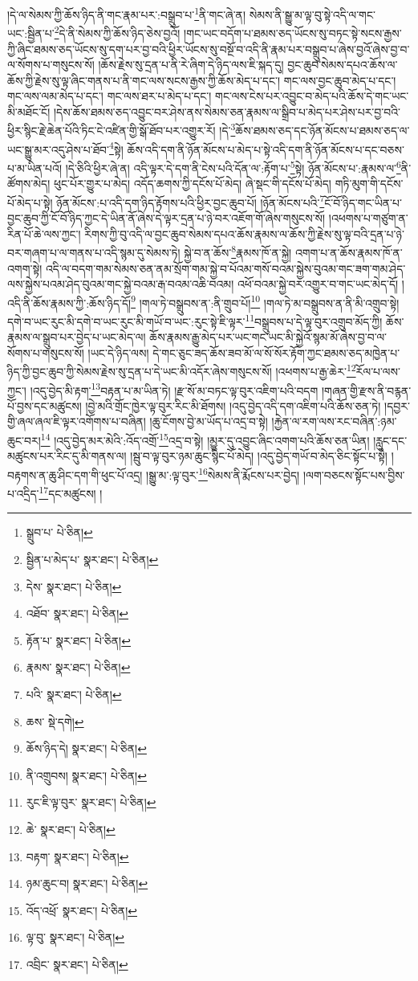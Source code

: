 །དེ་ལ་སེམས་ཀྱི་ཆོས་ཉིད་ནི་གང་རྣམ་པར་:བསྒྲུབ་པ་\footnote{སྒྲུབ་པ་  པེ་ཅིན། }ནི་གང་ཞེ་ན། སེམས་ནི་སྒྱུ་མ་ལྟ་བུ་སྟེ་འདི་ལ་གང་ཡང་:སྦྱིན་པ་\footnote{སྦྱིན་པ་མེད་པ་  སྣར་ཐང་།  པེ་ཅིན། }དེ་ནི་སེམས་ཀྱི་ཆོས་ཉིད་ཅེས་བྱའོ། །གང་ཡང་བདོག་པ་ཐམས་ཅད་ཡོངས་སུ་བཏང་སྟེ་སངས་རྒྱས་ཀྱི་ཞིང་ཐམས་ཅད་ཡོངས་སུ་དག་པར་བྱ་བའི་ཕྱིར་ཡོངས་སུ་བསྔོ་བ་འདི་ནི་རྣམ་པར་བསྒྲུབ་པ་ཞེས་བྱའོ་ཞེས་བྱ་བ་ལ་སོགས་པ་གསུངས་སོ། །ཆོས་རྗེས་སུ་དྲན་པ་ནི་རེ་ཞིག་དེ་ཉིད་ལས་ཇི་སྐད་དུ། བྱང་ཆུབ་སེམས་དཔའ་ཆོས་ལ་ཆོས་ཀྱི་རྗེས་སུ་ལྟ་ཞིང་གནས་པ་ནི་གང་ལས་སངས་རྒྱས་ཀྱི་ཆོས་མེད་པ་དང་། གང་ལས་བྱང་ཆུབ་མེད་པ་དང་། གང་ལས་ལམ་མེད་པ་དང་། གང་ལས་ཐར་པ་མེད་པ་དང་། གང་ལས་ངེས་པར་འབྱུང་བ་མེད་པའི་ཆོས་དེ་གང་ཡང་མི་མཐོང་ངོ། །དེས་ཆོས་ཐམས་ཅད་འབྱུང་བར་ཤེས་ནས་སེམས་ཅན་རྣམས་ལ་སྒྲིབ་པ་མེད་པར་ཤེས་པར་བྱ་བའི་ཕྱིར་སྙིང་རྗེ་ཆེན་པོའི་ཏིང་ངེ་འཛིན་གྱི་སྒོ་ཐོབ་པར་འགྱུར་རོ། །དེ་\footnote{དེས་  སྣར་ཐང་།  པེ་ཅིན། }ཆོས་ཐམས་ཅད་དང་ཉོན་མོངས་པ་ཐམས་ཅད་ལ་ཡང་སྒྱུ་མར་འདུ་ཤེས་པ་ཐོབ་\footnote{འཐོབ་  སྣར་ཐང་།  པེ་ཅིན། }སྟེ། ཆོས་འདི་དག་ནི་ཉོན་མོངས་པ་མེད་པ་སྟེ་འདི་དག་ནི་ཉོན་མོངས་པ་དང་བཅས་པ་མ་ཡིན་པའོ། །དེ་ཅིའི་ཕྱིར་ཞེ་ན། འདི་ལྟར་དེ་དག་ནི་ངེས་པའི་དོན་ལ་:རྟོག་པ་\footnote{རྟོན་པ་  སྣར་ཐང་།  པེ་ཅིན། }སྟེ། ཉོན་མོངས་པ་:རྣམས་ལ་\footnote{རྣམས་  སྣར་ཐང་།  པེ་ཅིན། }ནི་ཚོགས་མེད། ཕུང་པོར་གྱུར་པ་མེད། འདོད་ཆགས་ཀྱི་དངོས་པོ་མེད། ཞེ་སྡང་གི་དངོས་པོ་མེད། གཏི་མུག་གི་དངོས་པོ་མེད་པ་སྟེ། ཉོན་མོངས་:པ་འདི་དག་ཉིད་རྟོགས་པའི་ཕྱིར་བྱང་ཆུབ་པོ། །ཉོན་མོངས་པའི་\footnote{པའི་  སྣར་ཐང་།  པེ་ཅིན། }ངོ་བོ་ཉིད་གང་ཡིན་པ་བྱང་ཆུབ་ཀྱི་ངོ་བོ་ཉིད་ཀྱང་དེ་ཡིན་ནོ་ཞེས་དེ་ལྟར་དྲན་པ་ཉེ་བར་འཇོག་གོ་ཞེས་གསུངས་སོ། །འཕགས་པ་གཙུག་ན་རིན་པོ་ཆེ་ལས་ཀྱང་། རིགས་ཀྱི་བུ་འདི་ལ་བྱང་ཆུབ་སེམས་དཔའ་ཆོས་རྣམས་ལ་ཆོས་ཀྱི་རྗེས་སུ་ལྟ་བའི་དྲན་པ་ཉེ་བར་གཞག་པ་ལ་གནས་པ་འདི་སྙམ་དུ་སེམས་ཏེ། སྐྱེ་བ་ན་ཆོས་\footnote{ཆས་  སྡེ་དགེ། }རྣམས་ཁོ་ན་སྐྱེ། འགག་པ་ན་ཆོས་རྣམས་ཁོ་ན་འགག་སྟེ། འདི་ལ་བདག་གམ་སེམས་ཅན་ནམ་སྲོག་གམ་སྐྱེ་བ་པོའམ་གསོ་བའམ་སྐྱེས་བུའམ་གང་ཟག་གམ་ཤེད་ལས་སྐྱེས་པའམ་ཤེད་བུའམ་གང་སྐྱེ་བའམ་རྒ་བའམ་འཆི་བའམ། འཕོ་བའམ་སྐྱེ་བར་འགྱུར་བ་གང་ཡང་མེད་དོ། །འདི་ནི་ཆོས་རྣམས་ཀྱི་:ཆོས་ཉིད་དོ།\footnote{ཆོས་ཉིད་དེ།  སྣར་ཐང་།  པེ་ཅིན། } །གལ་ཏེ་བསྒྲུབས་ན་:ནི་གྲུབ་པོ།\footnote{ནི་འགྲུབས།  སྣར་ཐང་།  པེ་ཅིན། } །གལ་ཏེ་མ་བསྒྲུབས་ན་ནི་མི་འགྲུབ་སྟེ། དགེ་བ་ཡང་རུང་མི་དགེ་བ་ཡང་རུང་མི་གཡོ་བ་ཡང་:རུང་སྟེ་ཇི་ལྟར་\footnote{རུང་ཇི་ལྟ་བུར་  སྣར་ཐང་།  པེ་ཅིན། }བསྒྲུབས་པ་དེ་ལྟ་བུར་འགྲུབ་མོད་ཀྱི། ཆོས་རྣམས་ལ་སྒྲུབ་པར་བྱེད་པ་ཡང་མེད་ལ། ཆོས་རྣམས་རྒྱུ་མེད་པར་ཡང་གང་ཡང་མི་སྐྱེའོ་སྙམ་མོ་ཞེས་བྱ་བ་ལ་སོགས་པ་གསུངས་སོ། །ཡང་དེ་ཉིད་ལས། དེ་གང་ཅུང་ཟད་ཆོས་ཟབ་མོ་ལ་སོ་སོར་རྟོག་ཀྱང་ཐམས་ཅད་མཁྱེན་པ་ཉིད་ཀྱི་བྱང་ཆུབ་ཀྱི་སེམས་རྗེས་སུ་དྲན་པ་དེ་ཡང་མི་འདོར་ཞེས་གསུངས་སོ། །འཕགས་པ་རྒྱ་ཆེར་\footnote{ཆེ་  སྣར་ཐང་།  པེ་ཅིན། }རོལ་པ་ལས་ཀྱང་། །འདུ་བྱེད་མི་རྟག་\footnote{བརྟག་  སྣར་ཐང་།  པེ་ཅིན། }བརྟན་པ་མ་ཡིན་ཏེ། །རྫ་སོ་མ་བཏང་ལྟ་བུར་འཇིག་པའི་བདག །གཞན་གྱི་རྫས་ནི་བརྙན་པོ་བྱས་དང་མཚུངས། །བྱེ་མའི་གྲོང་ཁྱེར་ལྟ་བུར་རིང་མི་ཐོགས། །འདུ་བྱེད་འདི་དག་འཇིག་པའི་ཆོས་ཅན་ཏེ། །དབྱར་གྱི་ཞལ་ཞལ་ཇི་ལྟར་འགོགས་པ་བཞིན། །ཆུ་ངོགས་བྱེ་མ་ཡོད་པ་འདྲ་བ་སྟེ། །རྐྱེན་ལ་རག་ལས་རང་བཞིན་:ཉམ་ཆུང་བར།\footnote{ཉམ་ཆུང་བ།  སྣར་ཐང་།  པེ་ཅིན། } །འདུ་བྱེད་མར་མེའི་:འོད་འགྲོ་\footnote{འོད་འཕྲོ་  སྣར་ཐང་།  པེ་ཅིན། }འདྲ་བ་སྟེ། །མྱུར་དུ་འབྱུང་ཞིང་འགག་པའི་ཆོས་ཅན་ཡིན། །རླུང་དང་མཚུངས་པར་རིང་དུ་མི་གནས་ལ། །སྦུ་བ་ལྟ་བུར་ཉམ་ཆུང་སྙིང་པོ་མེད། །འདུ་བྱེད་གཡོ་བ་མེད་ཅིང་སྟོང་པ་སྟེ། །བརྟགས་ན་ཆུ་ཤིང་དག་གི་ཕུང་པོ་འདྲ། །སྒྱུ་མ་:ལྟ་བུར་\footnote{ལྟ་བུ་  སྣར་ཐང་།  པེ་ཅིན། }སེམས་ནི་རྨོངས་པར་བྱེད། །ལག་བཅངས་སྟོང་པས་བྱིས་པ་འདྲིད་\footnote{འབྲིང་  སྣར་ཐང་།  པེ་ཅིན། }དང་མཚུངས། །

